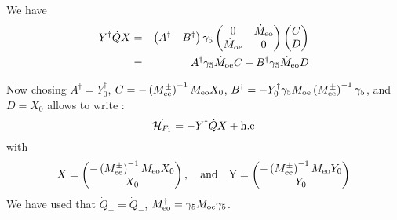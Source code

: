 \documentclass{article}[12pt]
\begin{document}
We have 
\begin{eqnarray}
  Y ^{\dagger} \dot{Q} X  &=& \begin{pmatrix} A^\dagger &
    B^\dagger \end{pmatrix} \gamma_5 \begin{pmatrix} 
 0  & \dot{M}_{\rm{eo}} \\
\dot{M}_{\rm{oe}} & 0\\
\end{pmatrix}  \begin{pmatrix} C \\  D \end{pmatrix} \\
&=&  A^\dagger \gamma_5 \dot{M}_{\rm{oe}}  C + B^\dagger \gamma_5 \dot{M}_{\rm{eo}} D
\end{eqnarray}

Now chosing $A^\dagger= Y^\dagger_0 $,
$C=-\left(M^{\pm}_{\rm{ee}}\right)^{-1} M_{\rm{eo}} X_0 $, $B^\dagger=
- Y_0^\dagger \gamma_5 M_{\rm{oe}}
     \left(M^{\pm}_{\rm{ee}}\right)^{-1} \gamma_5$, and $D= X_0$ allows to write :
\begin{equation}
\dot{\mathcal{H}_{F_1}} = -  Y^\dagger \dot{Q} X
  + \rm{h.c} 
\end{equation} 
with 
\begin{equation}
X=\begin{pmatrix}-\left(M^{\pm}_{\rm{ee}}\right)^{-1} M_{\rm{eo}} X_0
  \\ X_0 \end{pmatrix},\quad \rm{and} \quad Y=\begin{pmatrix}-
   \left(M^{\pm}_{\rm{ee}}\right)^{-1} M_{\rm{eo}} Y_0
  \\ Y_0 \end{pmatrix}
\end{equation}
We have used that   $\dot{Q}_+= \dot{Q}_-$, $M_{\rm{eo}}^{\dagger}=
\gamma_5 M_{\rm{oe}} \gamma_5$.



\end{document}
